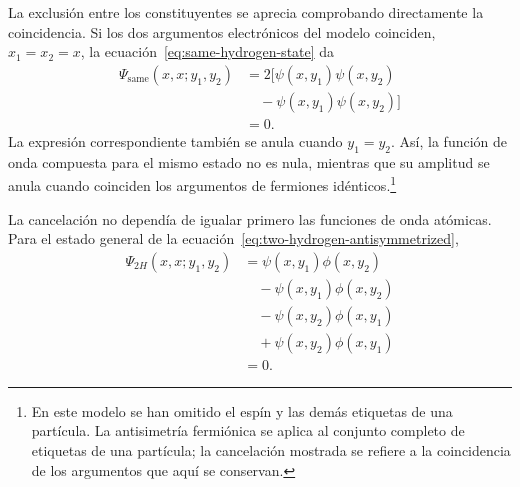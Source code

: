 La exclusión entre los constituyentes se aprecia comprobando directamente la coincidencia. Si los dos argumentos electrónicos del modelo coinciden, \(x_1=x_2=x\), la ecuación~\eqref{eq:same-hydrogen-state} da
\begin{align}
\Psi_{\mathrm{same}}(x,x;y_1,y_2)
&=2\bigl[
\psi(x,y_1)\psi(x,y_2)\nonumber\\
&\quad{}-\psi(x,y_1)\psi(x,y_2)
\bigr]\\
&=0.
\end{align}
La expresión correspondiente también se anula cuando \(y_1=y_2\). Así, la función de onda compuesta para el mismo estado no es nula, mientras que su amplitud se anula cuando coinciden los argumentos de fermiones idénticos.\footnote{En este modelo se han omitido el espín y las demás etiquetas de una partícula. La antisimetría fermiónica se aplica al conjunto completo de etiquetas de una partícula; la cancelación mostrada se refiere a la coincidencia de los argumentos que aquí se conservan.}

\begin{classroomqa}
\end{classroomqa}

\begin{classroomqa}
\end{classroomqa}

La cancelación no dependía de igualar primero las funciones de onda atómicas. Para el estado general de la ecuación~\eqref{eq:two-hydrogen-antisymmetrized},
\begin{align}
\Psi_{2H}(x,x;y_1,y_2)
&=\psi(x,y_1)\phi(x,y_2)\nonumber\\
&\quad{}-\psi(x,y_1)\phi(x,y_2)\nonumber\\
&\quad{}-\psi(x,y_2)\phi(x,y_1)\nonumber\\
&\quad{}+\psi(x,y_2)\phi(x,y_1)\\
&=0.
\end{align}


